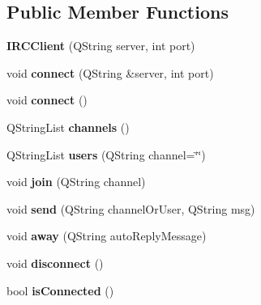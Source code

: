 \subsection*{Public Member Functions}
\begin{DoxyCompactItemize}
\item 
\hypertarget{classirc_1_1IRCClient_a657fc7a3d450d15df12828f28b12626f}{
{\bfseries IRCClient} (QString server, int port)}
\label{classirc_1_1IRCClient_a657fc7a3d450d15df12828f28b12626f}

\item 
\hypertarget{classirc_1_1IRCClient_a85ea31317f832f3a453c66a9baff6e62}{
void {\bfseries connect} (QString \&server, int port)}
\label{classirc_1_1IRCClient_a85ea31317f832f3a453c66a9baff6e62}

\item 
\hypertarget{classirc_1_1IRCClient_a7d685ca805db36a04005d72faa24c827}{
void {\bfseries connect} ()}
\label{classirc_1_1IRCClient_a7d685ca805db36a04005d72faa24c827}

\item 
\hypertarget{classirc_1_1IRCClient_aace478ff723efea8919a800ad3980008}{
QStringList {\bfseries channels} ()}
\label{classirc_1_1IRCClient_aace478ff723efea8919a800ad3980008}

\item 
\hypertarget{classirc_1_1IRCClient_a705a73d30fd2b74c1d38199d0c36becb}{
QStringList {\bfseries users} (QString channel=\char`\"{}\char`\"{})}
\label{classirc_1_1IRCClient_a705a73d30fd2b74c1d38199d0c36becb}

\item 
\hypertarget{classirc_1_1IRCClient_a6d59b38c685e683f2ebee71f7b238a3d}{
void {\bfseries join} (QString channel)}
\label{classirc_1_1IRCClient_a6d59b38c685e683f2ebee71f7b238a3d}

\item 
\hypertarget{classirc_1_1IRCClient_a350d2c7a665b498c384f58a214e8c8e6}{
void {\bfseries send} (QString channelOrUser, QString msg)}
\label{classirc_1_1IRCClient_a350d2c7a665b498c384f58a214e8c8e6}

\item 
\hypertarget{classirc_1_1IRCClient_a3538774cd3ca8629b792102a1308c8dd}{
void {\bfseries away} (QString autoReplyMessage)}
\label{classirc_1_1IRCClient_a3538774cd3ca8629b792102a1308c8dd}

\item 
\hypertarget{classirc_1_1IRCClient_ae34f5ce7f42610f39b455a4e6722f79a}{
void {\bfseries disconnect} ()}
\label{classirc_1_1IRCClient_ae34f5ce7f42610f39b455a4e6722f79a}

\item 
\hypertarget{classirc_1_1IRCClient_a6950489f557bd264ecb5c51ea76d7cb2}{
bool {\bfseries isConnected} ()}
\label{classirc_1_1IRCClient_a6950489f557bd264ecb5c51ea76d7cb2}

\end{DoxyCompactItemize}
